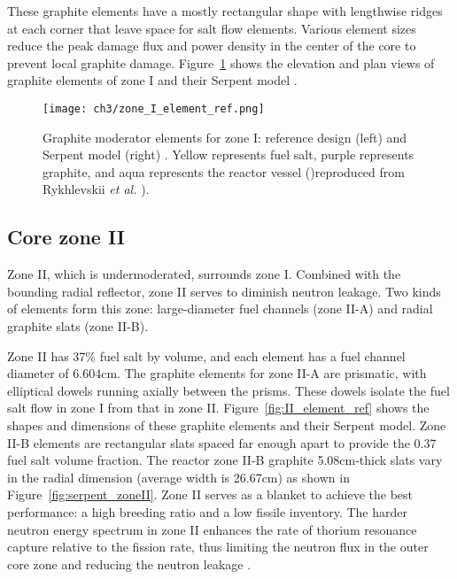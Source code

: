 These graphite elements have a mostly rectangular shape with lengthwise ridges 
at each corner that leave space for salt flow elements. Various element sizes 
reduce the peak damage flux and power density in the center of the core to 
prevent local graphite damage. Figure~\ref{fig:I_element_ref} shows the 
elevation and plan views of graphite elements of zone I 
\cite{robertson_conceptual_1971} and their Serpent model 
\cite{rykhlevskii_full-core_2017}.
\begin{figure}[ht!] %
	\texttt{[image: ch3/zone\_I\_element\_ref.png]}
	\caption{Graphite moderator elements for zone I: reference design (left)
		\cite{robertson_conceptual_1971} and Serpent model (right) 
		\cite{rykhlevskii_full-core_2017}.  Yellow 
		represents fuel salt, purple represents graphite, and aqua represents 
		the reactor vessel ()reproduced from Rykhlevskii \emph{et al.} 
		\cite{rykhlevskii_modeling_2019}).}
	\label{fig:I_element_ref}
\end{figure}

\subsection{Core zone II}
Zone II, which is undermoderated, surrounds zone I. Combined with the bounding 
radial reflector, zone II serves to diminish neutron leakage. Two kinds of 
elements form this zone: large-diameter fuel channels (zone II-A) and 
radial graphite slats (zone II-B). 

Zone II has 37\% fuel salt by volume, and each element has a fuel channel 
diameter of 6.604cm. The graphite elements for zone II-A are prismatic, with
elliptical dowels running axially between the prisms. These dowels
isolate the fuel salt flow in zone I from that in zone II.  
Figure~\ref{fig:II_element_ref} shows the shapes and dimensions of these 
graphite elements and their Serpent model. Zone II-B elements are rectangular 
slats spaced far enough apart to provide the 0.37 fuel salt volume fraction. 
The reactor zone II-B graphite 5.08cm-thick slats vary in the radial dimension 
(average width is 26.67cm) as shown in Figure~\ref{fig:serpent_zoneII}. Zone 
II serves as a blanket to achieve the best performance: a high breeding ratio 
and a low fissile inventory. The harder neutron energy spectrum in zone II 
enhances the rate of thorium resonance capture relative to the fission rate, 
thus limiting the neutron flux in the outer core zone and reducing the neutron 
leakage \cite{robertson_conceptual_1971}. 

